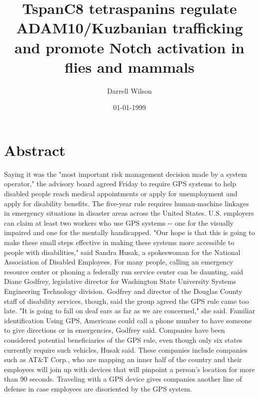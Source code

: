 \documentclass{article}%
\title{TspanC8 tetraspanins regulate ADAM10/Kuzbanian trafficking and promote Notch activation in flies and mammals}%
\author{Darrell Wilson}%
\affil{School of Medicine, Chung Shan Medical University, 110 Chien{-}Kuo N. Road, Section 1, Taichung 402, Taiwan}%
\date{01{-}01{-}1999}%
\begin{document}
%
\normalsize%
\maketitle%
\section{Abstract}%
\label{sec:Abstract}%
Saying it was the "most important risk management decision made by a system operator," the advisory board agreed Friday to require GPS systems to help disabled people reach medical appointments or apply for unemployment and apply for disability benefits.\newline%
The five{-}year rule requires human{-}machine linkages in emergency situations in disaster areas across the United States. U.S. employers can claim at least two workers who use GPS systems {-}{-} one for the visually impaired and one for the mentally handicapped.\newline%
"Our hope is that this is going to make these small steps effective in making these systems more accessible to people with disabilities," said Sandra Husak, a spokeswoman for the National Association of Disabled Employees.\newline%
For many people, calling an emergency resource center or phoning a federally run service center can be daunting, said Diane Godfrey, legislative director for Washington State University Systems Engineering Technology division. Godfrey and director of the Douglas County staff of disability services, though, said the group agreed the GPS rule came too late.\newline%
"It is going to fall on deaf ears as far as we are concerned," she said.\newline%
Familiar identification\newline%
Using GPS, Americans could call a phone number to have someone to give directions or in emergencies, Godfrey said.\newline%
Companies have been considered potential beneficiaries of the GPS rule, even though only six states currently require such vehicles, Husak said. These companies include companies such as AT\&T Corp., who are mapping an inner half of the country and their employees will join up with devices that will pinpoint a person's location for more than 90 seconds.\newline%
Traveling with a GPS device gives companies another line of defense in case employees are disoriented by the GPS system.\newline%
\end{document}
